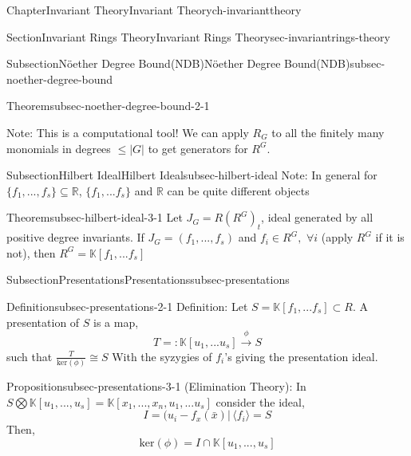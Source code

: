 \documentclass[oneside,10pt,]{book}
\newcommand{\R}{\mathbb R}
\begin{document}
\begin{chapterptx}{Chapter}{Invariant Theory}{}{Invariant Theory}{}{}{ch-invarianttheory}
\begin{sectionptx}{Section}{Invariant Rings Theory}{}{Invariant Rings Theory}{}{}{sec-invariantrings-theory}
\begin{subsectionptx}{Subsection}{Nöether Degree Bound(NDB)}{}{Nöether Degree Bound(NDB)}{}{}{subsec-noether-degree-bound}
\begin{theorem}{Theorem}{}{}{subsec-noether-degree-bound-2-1}
\end{theorem}
%
\par
Note: This is a computational tool! We can apply \(R_G\) to all the finitely many monomials in degrees \(\leq |G|\) to get generators for \(R^G\).%
\end{subsectionptx}
%
%
\typeout{************************************************}
\typeout{************************************************}
%
\begin{subsectionptx}{Subsection}{Hilbert Ideal}{}{Hilbert Ideal}{}{}{subsec-hilbert-ideal}
Note: In general for \(\{ f_1,..., f_s\} \subseteq \R\), \(\{f_1,...f_s\}\) and \(\R\) can be quite different objects%
\par
\begin{theorem}{Theorem}{}{}{subsec-hilbert-ideal-3-1}%
Let \(J_G = R(R^G)_t\), ideal generated by all positive degree invariants. If \(J_G = (f_1,...,f_s)\) and \(f_i\in R^G, \,\, \forall i\) (apply \(R^G\) if it is not), then \(R^G = \mathbb{K}[f_1,...f_s]\)%
\end{theorem}
%
\end{subsectionptx}
%
%
\typeout{************************************************}
\typeout{************************************************}
%
\begin{subsectionptx}{Subsection}{Presentations}{}{Presentations}{}{}{subsec-presentations}
\begin{definition}{Definition}{}{subsec-presentations-2-1}%
Definition: Let \(S = \mathbb{K}[f_1,...f_s] \subset R\). A presentation of \(S\) is a map,%
\begin{equation*}
T=: \mathbb{K}[u_1,...u_s] \xrightarrow{\phi}S
\end{equation*}
such that \(\frac{T}{\text{ker}(\phi)} \cong S\) With the syzygies of \(f_i\)'s giving the presentation ideal.%
\end{definition}
%
\par
\begin{proposition}{Proposition}{}{}{subsec-presentations-3-1}%
(Elimination Theory): In \(S \bigotimes \mathbb{K}[u_1,...,u_s] = \mathbb{K}[x_1,...,x_n,u_1,...u_s]\) consider the ideal,%
\begin{equation*}
I = (u_i - f_x(\bar x) | \, \langle f_i\rangle = S
\end{equation*}
Then,%
\begin{equation*}
\text{ker} (\phi)= I \cap \mathbb{K}[u_1,...,u_s]
\end{equation*}

\end{proposition}
\end{subsectionptx}
\end{sectionptx}
\end{chapterptx}
\end{document}
